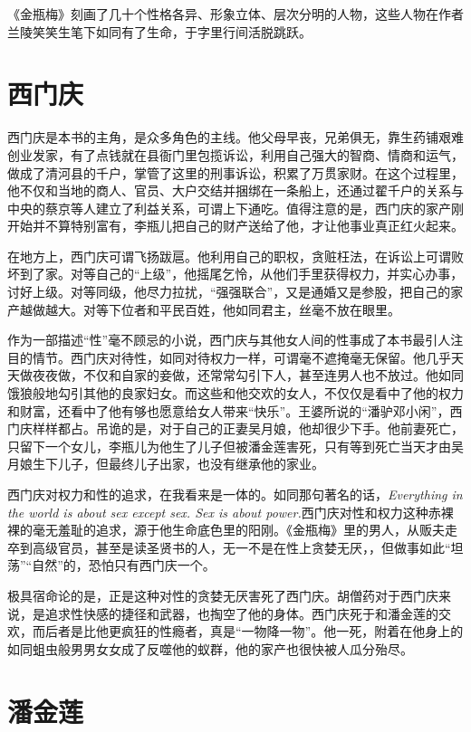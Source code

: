 《金瓶梅》刻画了几十个性格各异、形象立体、层次分明的人物，这些人物在作者兰陵笑笑生笔下如同有了生命，于字里行间活脱跳跃。

\section{西门庆}
西门庆是本书的主角，是众多角色的主线。他父母早丧，兄弟俱无，靠生药铺艰难创业发家，有了点钱就在县衙门里包揽诉讼，利用自己强大的智商、情商和运气，做成了清河县的千户，掌管了这里的刑事诉讼，积累了万贯家财。在这个过程里，他不仅和当地的商人、官员、大户交结并捆绑在一条船上，还通过翟千户的关系与中央的蔡京等人建立了利益关系，可谓上下通吃。值得注意的是，西门庆的家产刚开始并不算特别富有，李瓶儿把自己的财产送给了他，才让他事业真正红火起来。

在地方上，西门庆可谓飞扬跋扈。他利用自己的职权，贪赃枉法，在诉讼上可谓败坏到了家。对等自己的“上级”，他摇尾乞怜，从他们手里获得权力，并实心办事，讨好上级。对等同级，他尽力拉扰，“强强联合”，又是通婚又是参股，把自己的家产越做越大。对等下位者和平民百姓，他如同君主，丝毫不放在眼里。

作为一部描述“性”毫不顾忌的小说，西门庆与其他女人间的性事成了本书最引人注目的情节。西门庆对待性，如同对待权力一样，可谓毫不遮掩毫无保留。他几乎天天做夜夜做，不仅和自家的妾做，还常常勾引下人，甚至连男人也不放过。他如同饿狼般地勾引其他的良家妇女。而这些和他交欢的女人，不仅仅是看中了他的权力和财富，还看中了他有够也愿意给女人带来“快乐”。王婆所说的“潘驴邓小闲”，西门庆样样都占。吊诡的是，对于自己的正妻吴月娘，他却很少下手。他前妻死亡，只留下一个女儿，李瓶儿为他生了儿子但被潘金莲害死，只有等到死亡当天才由吴月娘生下儿子，但最终儿子出家，也没有继承他的家业。

西门庆对权力和性的追求，在我看来是一体的。如同那句著名的话，\emph{Everything in the world is about sex except sex. Sex is about power.}西门庆对性和权力这种赤裸裸的毫无羞耻的追求，源于他生命底色里的阳刚。《金瓶梅》里的男人，从贩夫走卒到高级官员，甚至是读圣贤书的人，无一不是在性上贪婪无厌，，但做事如此“坦荡”“自然”的，恐怕只有西门庆一个。

极具宿命论的是，正是这种对性的贪婪无厌害死了西门庆。胡僧药对于西门庆来说，是追求性快感的捷径和武器，也掏空了他的身体。西门庆死于和潘金莲的交欢，而后者是比他更疯狂的性瘾者，真是“一物降一物”。他一死，附着在他身上的如同蛆虫般男男女女成了反噬他的蚁群，他的家产也很快被人瓜分殆尽。

\section{潘金莲}

